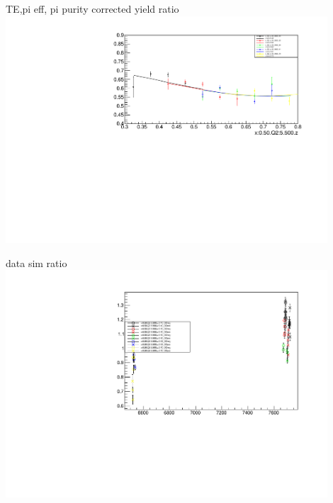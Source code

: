\begin{frame}{TE,pi eff, pi purity corrected yield ratio}
\includegraphics[width = 0.9\textwidth]{results/yield/statistics_corr/x_Q2_50_5500_ratio.pdf}
\end{frame}
\begin{frame}{data sim ratio}
    \includegraphics[width = 0.9\textwidth]{results/yield/run_info_pdf/x_Q2_50_5500_data_simc_ratio.pdf}
\end{frame}

